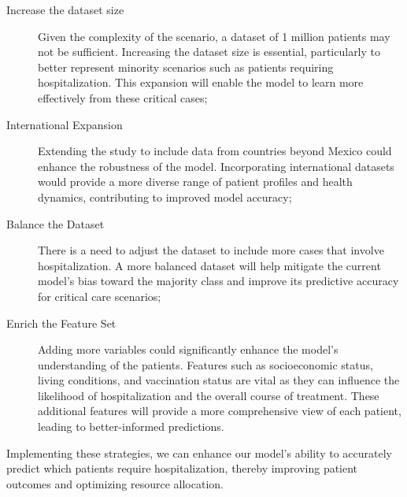 \begin{description}
    \item[Increase the dataset size] Given the complexity of the 
    scenario, a dataset of 1 million patients may not be sufficient.
    Increasing the dataset size is essential, particularly to better 
    represent minority scenarios such as patients requiring 
    hospitalization. This expansion will enable the model to learn
    more effectively from these critical cases;
    \item[International Expansion] Extending the study to include data 
    from countries beyond Mexico could enhance the robustness of the 
    model. Incorporating international datasets would provide a more 
    diverse range of patient profiles and health dynamics, contributing
    to improved model accuracy;
    \item[Balance the Dataset] There is a need to adjust the dataset to
    include more cases that involve hospitalization. A more balanced 
    dataset will help mitigate the current model's bias toward the 
    majority class and improve its predictive accuracy for critical care 
    scenarios;
    \item[Enrich the Feature Set] Adding more variables could 
    significantly enhance the model's understanding of the patients. 
    Features such as socioeconomic status, living conditions, and 
    vaccination status are vital as they can influence the likelihood of
    hospitalization and the overall course of treatment. These
    additional features will provide a more comprehensive view of each 
    patient, leading to better-informed predictions.
\end{description}

Implementing these strategies, we can enhance our model’s ability to 
accurately predict which patients require hospitalization, thereby 
improving patient outcomes and optimizing resource allocation.



